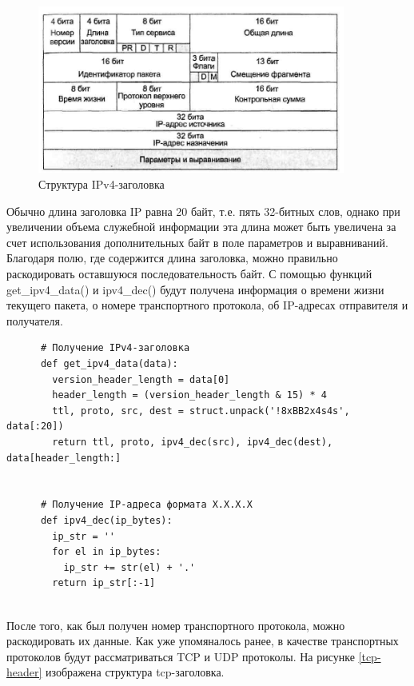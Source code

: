 \documentclass[bachelor, och, coursework]{SCWorks}
\begin{document}
    \begin{figure}[H]
      \centering
      \includegraphics[width=0.9\textwidth]{photo/ipv4-header.jpg}
      \caption{Структура IPv4-заголовка}
      \label{ipv4-header}
    \end{figure}
      
    Обычно длина заголовка IP равна 20 байт, т.е. пять 32-битных слов, однако при увеличении объема служебной информации эта длина может быть увеличена
    за счет использования дополнительных байт в поле параметров и выравниваний. Благодаря полю, где содержится
    длина заголовка, можно правильно раскодировать оставшуюся последовательность байт. С помощью функций get_ipv4_data() и ipv4_dec() будут получена 
    информация о времени жизни текущего пакета, о номере транспортного протокола, об IP-адресах отправителя и получателя.
  
    \begin{verbatim}
      # Получение IPv4-заголовка
      def get_ipv4_data(data):
        version_header_length = data[0]
        header_length = (version_header_length & 15) * 4
        ttl, proto, src, dest = struct.unpack('!8xBB2x4s4s', data[:20])
        return ttl, proto, ipv4_dec(src), ipv4_dec(dest), data[header_length:]
      
      
      # Получение IP-адреса формата X.X.X.X
      def ipv4_dec(ip_bytes):
        ip_str = ''
        for el in ip_bytes:
          ip_str += str(el) + '.'
        return ip_str[:-1]
      
    \end{verbatim}

    После того, как был получен номер транспортного протокола, можно раскодировать их данные. Как уже упомяналось ранее, в качестве транспортных протоколов
    будут рассматриваться TCP и UDP протоколы. На рисунке \ref{tcp-header} изображена структура tcp-заголовка.
  
\end{document}
